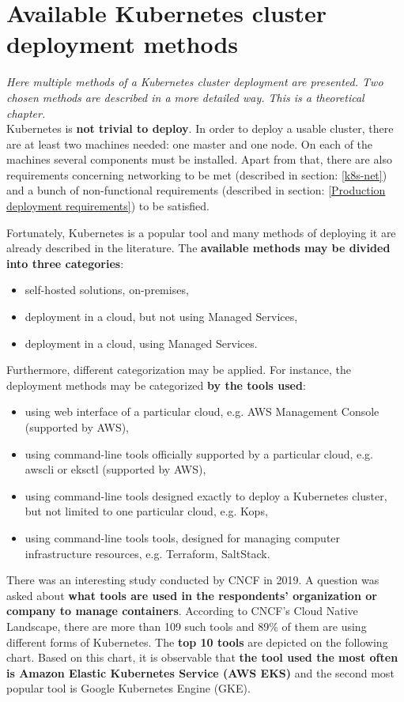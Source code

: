 \section{Available Kubernetes cluster deployment methods}
\label{3-methods}
\textit{Here multiple methods of a Kubernetes cluster deployment are presented. Two chosen methods are described in a more detailed way. This is a theoretical chapter.}
\\

Kubernetes is \textbf{not trivial to deploy}. In order to deploy a usable cluster, there are at least two machines needed: one master and one node. On each of the machines several components must be installed. Apart from that, there are also requirements concerning networking to be met (described in section: \ref{k8s-net}) and a bunch of non-functional requirements (described in section: \ref{Production deployment requirements}) to be satisfied.

Fortunately, Kubernetes is a popular tool and many methods of deploying it are already described in the literature. The \textbf{available methods may be divided into three categories}:
\begin{itemize}
\item self-hosted solutions, on-premises,
\item deployment in a cloud, but not using Managed Services,
\item deployment in a cloud, using Managed Services.
\end{itemize}

Furthermore, different categorization may be applied. For instance, the deployment methods may be categorized \textbf{by the tools used}:
\begin{itemize}
\item using web interface of a particular cloud, e.g. AWS Management Console (supported by AWS),
\item using command-line tools officially supported by a particular cloud, e.g. awscli or eksctl (supported by AWS),
\item using command-line tools designed exactly to deploy a Kubernetes cluster, but not limited to one particular cloud, e.g. Kops,
\item using command-line tools tools, designed for managing computer infrastructure resources, e.g. Terraform, SaltStack.
\end{itemize}

There was an interesting study conducted by CNCF in 2019. A question was asked about \textbf{what tools are used in the respondents' organization or company to manage containers}. According to CNCF's Cloud Native Landscape, there are more than 109 such tools and 89\% of them are using different forms of Kubernetes. The \textbf{top 10 tools} are depicted on the following chart\cite{cncf-2019}. Based on this chart, it is observable that \textbf{the tool used the most often is Amazon Elastic Kubernetes Service (AWS EKS)} and the second most popular tool is Google Kubernetes Engine (GKE).

